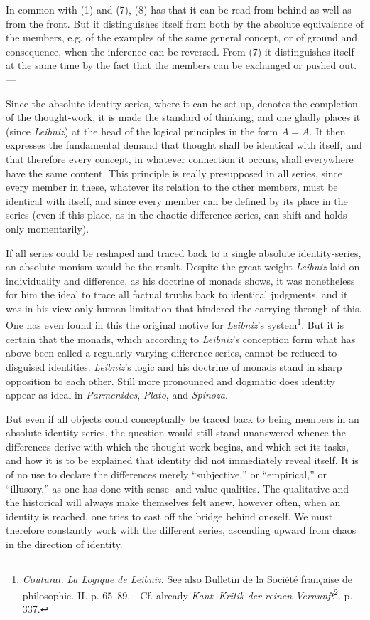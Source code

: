 \documentclass[12pt,a4paper]{book}
\newcommand{\opage}[1]{\marginnote{\footnotesize\textit{[#1]}}}
\begin{document}
\opage{171}In common with (1) and (7), (8) has that it can be read from behind as well
as from the front. But it distinguishes itself from both by the absolute
equivalence of the members, e.g. of the examples of the same general
concept, or of ground and consequence, when the inference can be reversed.
From (7) it distinguishes itself at the same time by the fact that the
members can be exchanged or pushed out.---

Since the absolute identity-series, where it can be set up, denotes the
completion of the thought-work, it is made the standard of thinking, and one
gladly places it (since \emph{Leibniz}) at the head of the logical
principles in the form $A = A$. It then expresses the fundamental demand
that thought shall be identical with itself, and that therefore every
concept, in whatever connection it occurs, shall everywhere have the same
content. This principle is really presupposed in all series, since every
member in these, whatever its relation to the other members, must be
identical with itself, and since every member can be defined by its place in
the series (even if this place, as in the chaotic difference-series, can
shift and holds only momentarily).

If all series could be reshaped and traced back to a single absolute
identity-series, an absolute monism would be the result. Despite the great
weight \emph{Leibniz} laid on individuality and difference, as his doctrine
of monads shows, it was nonetheless for him the ideal to trace all factual
truths back to identical judgments, and it was in his view only human
limitation that hindered the carrying-through of this. One has even found in
this the original motive for \emph{Leibniz}'s system\footnote{\emph{Couturat}:
\emph{La Logique de Leibniz}. See also Bulletin de la Société française de
philosophie. II. p. 65--89.---Cf. already \emph{Kant}: \emph{Kritik der
reinen Vernunft}\textsuperscript{2}. p. 337.}. But it is certain that the
monads, which according to \emph{Leibniz}'s conception form what has above
been called a regularly varying difference-series, cannot be reduced to
disguised identities. \emph{Leibniz}'s logic and his doctrine of monads
stand in sharp opposition to each other. Still more pronounced and dogmatic
does identity appear as ideal in \emph{Parmenides}, \emph{Plato}, and
\emph{Spinoza}.

\opage{172}But even if all objects could conceptually be traced back to being members
in an absolute identity-series, the question would still stand unanswered
whence the differences derive with which the thought-work begins, and which
set its tasks, and how it is to be explained that identity did not
immediately reveal itself. It is of no use to declare the differences merely
``subjective,'' or ``empirical,'' or ``illusory,'' as one has done with
sense- and value-qualities. The qualitative and the historical will always
make themselves felt anew, however often, when an identity is reached, one
tries to cast off the bridge behind oneself. We must therefore constantly
work with the different series, ascending upward from chaos in the direction
of identity.
\end{document}
